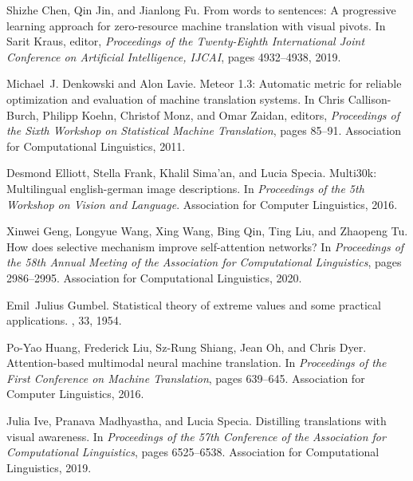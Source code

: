 \documentclass{article}
\begin{document}
\begin{thebibliography}{}
Shizhe Chen, Qin Jin, and Jianlong Fu.
\newblock From words to sentences: {A} progressive learning approach for
  zero-resource machine translation with visual pivots.
\newblock In Sarit Kraus, editor, {\em Proceedings of the Twenty-Eighth
  International Joint Conference on Artificial Intelligence, {IJCAI}}, pages
  4932--4938, 2019.

Michael~J. Denkowski and Alon Lavie.
\newblock Meteor 1.3: Automatic metric for reliable optimization and evaluation
  of machine translation systems.
\newblock In Chris Callison{-}Burch, Philipp Koehn, Christof Monz, and Omar
  Zaidan, editors, {\em Proceedings of the Sixth Workshop on Statistical
  Machine Translation}, pages 85--91. Association for Computational
  Linguistics, 2011.

Desmond Elliott, Stella Frank, Khalil Sima'an, and Lucia Specia.
\newblock Multi30k: Multilingual english-german image descriptions.
\newblock In {\em Proceedings of the 5th Workshop on Vision and Language}.
  Association for Computer Linguistics, 2016.

Xinwei Geng, Longyue Wang, Xing Wang, Bing Qin, Ting Liu, and Zhaopeng Tu.
\newblock How does selective mechanism improve self-attention networks?
\newblock In {\em Proceedings of the 58th Annual Meeting of the Association for
  Computational Linguistics}, pages 2986--2995. Association for Computational
  Linguistics, 2020.

Emil~Julius Gumbel.
\newblock Statistical theory of extreme values and some practical applications.
, 33, 1954.

Po{-}Yao Huang, Frederick Liu, Sz{-}Rung Shiang, Jean Oh, and Chris Dyer.
\newblock Attention-based multimodal neural machine translation.
\newblock In {\em Proceedings of the First Conference on Machine Translation},
  pages 639--645. Association for Computer Linguistics, 2016.

Julia Ive, Pranava Madhyastha, and Lucia Specia.
\newblock Distilling translations with visual awareness.
\newblock In {\em Proceedings of the 57th Conference of the Association for
  Computational Linguistics}, pages 6525--6538. Association for Computational
  Linguistics, 2019.


\end{thebibliography}
\end{document}
